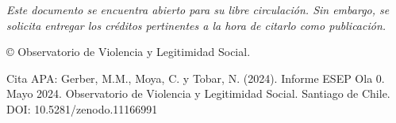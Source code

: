 \null\vfill
\begin{flushleft}
\thispagestyle{empty}
\textit{Este documento se encuentra abierto para su libre circulación. Sin embargo, se solicita entregar los créditos pertinentes a la hora de citarlo como publicación.}

© Observatorio de Violencia y Legitimidad Social. 

\noindent Cita APA: Gerber, M.M., Moya, C. y Tobar, N. (2024). Informe ESEP Ola 0. Mayo 2024. Observatorio de Violencia y Legitimidad Social. Santiago de Chile. DOI: 10.5281/zenodo.11166991

\end{flushleft}
